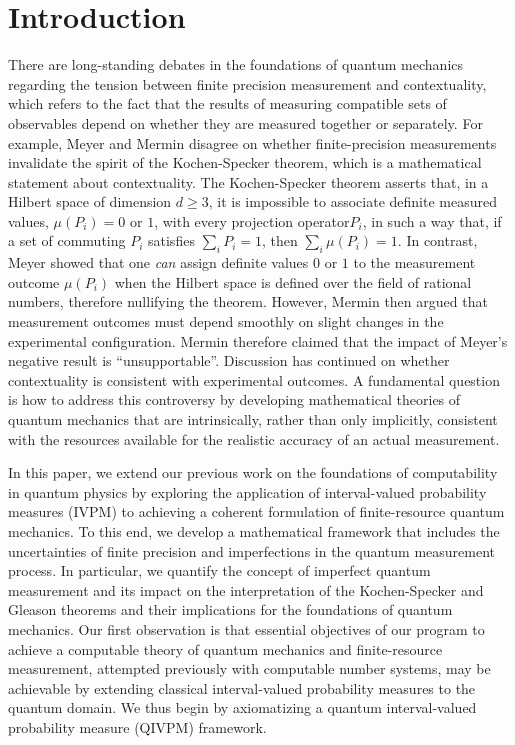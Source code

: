 \documentclass[english,reprint, aps, prl,superscriptaddress, showpacs,
showkeys, longbibliography, amsmath, amssymb]{revtex4-1}
\theoremstyle{plain}
\theoremstyle{definition}
\newcommand{\nb}{\nolinebreak[1] }
\begin{document}
\section{Introduction}

There are long-standing debates in the foundations of quantum
mechanics regarding the tension between finite precision measurement
and contextuality\nb\cite{BarrettKent2004,Appleby_2005}, which refers to the fact that the results of measuring compatible sets of observables depend  on whether they are measured together or separately.  For example,
Meyer\nb\cite{PhysRevLett.83.3751} and Mermin\nb\cite{Mermin1999} disagree
on whether finite-precision measurements invalidate the spirit of the Kochen-Specker
theorem\nb\cite{kochenspecker1967,peres1995quantum}, which is a mathematical statement about contextuality.   The Kochen-Specker theorem asserts that, in a Hilbert space of dimension
$d \ge 3$, it is impossible to associate definite measured values, $\mu(P_i)= 0$
or $1$, with every projection operator\nb$P_i$, in such a way that, if a set of commuting $P_i$ satisfies $\sum_i P_i = 1$, then $\sum_i \mu(P_i) = 1$. In contrast, Meyer showed that 
one {\it can\/}  assign definite values $0$ or $1$ to the measurement outcome $\mu(P_i)$ when the Hilbert space is defined over the field of rational numbers, therefore nullifying the theorem\nb\citep{PhysRevLett.83.3751}.
However, Mermin then argued that measurement outcomes must depend smoothly
on slight changes in the experimental configuration. Mermin therefore claimed that 
the impact of Meyer's negative result  is ``unsupportable''\nb\citep{Mermin1999}. 
Discussion
has continued on whether contextuality is consistent with  experimental outcomes\nb\cite{Spekkens2005,GuehneKleinmannCabelloEtAl2010,MazurekPuseyKunjwalEtAl2016}.
A fundamental question is how to address this controversy by developing
 mathematical theories of quantum mechanics that are intrinsically, rather than only implicitly, consistent with the resources available for the realistic accuracy of an actual measurement.

In this paper, we extend our previous work on the foundations of
computability in quantum physics by exploring the application of
interval-valued probability measures (IVPM) to achieving a coherent
formulation of finite-resource quantum mechanics.  To this end, we develop a mathematical framework that includes the uncertainties of finite precision and imperfections in the quantum measurement process. In particular, we quantify the concept of imperfect quantum measurement and its impact on the interpretation of the Kochen-Specker and Gleason theorems and their implications for the foundations of quantum mechanics.  Our first observation is that essential objectives of our program to
achieve a computable theory of quantum mechanics and finite-resource
measurement, attempted previously with computable number
systems\nb\cite{usat,geometry2013apsrev4,DQT2014}, may be achievable by
extending classical interval-valued probability
measures\nb\cite{JamisonLodwick2004} to the quantum domain.  We thus begin by axiomatizing a quantum interval-valued probability measure (QIVPM) framework.
\end{document}
